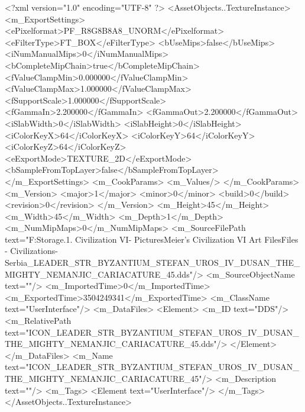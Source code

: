 <?xml version="1.0" encoding="UTF-8" ?>
<AssetObjects..TextureInstance>
	<m_ExportSettings>
		<ePixelformat>PF_R8G8B8A8_UNORM</ePixelformat>
		<eFilterType>FT_BOX</eFilterType>
		<bUseMips>false</bUseMips>
		<iNumManualMips>0</iNumManualMips>
		<bCompleteMipChain>true</bCompleteMipChain>
		<fValueClampMin>0.000000</fValueClampMin>
		<fValueClampMax>1.000000</fValueClampMax>
		<fSupportScale>1.000000</fSupportScale>
		<fGammaIn>2.200000</fGammaIn>
		<fGammaOut>2.200000</fGammaOut>
		<iSlabWidth>0</iSlabWidth>
		<iSlabHeight>0</iSlabHeight>
		<iColorKeyX>64</iColorKeyX>
		<iColorKeyY>64</iColorKeyY>
		<iColorKeyZ>64</iColorKeyZ>
		<eExportMode>TEXTURE_2D</eExportMode>
		<bSampleFromTopLayer>false</bSampleFromTopLayer>
	</m_ExportSettings>
	<m_CookParams>
		<m_Values/>
	</m_CookParams>
	<m_Version>
		<major>1</major>
		<minor>0</minor>
		<build>0</build>
		<revision>0</revision>
	</m_Version>
	<m_Height>45</m_Height>
	<m_Width>45</m_Width>
	<m_Depth>1</m_Depth>
	<m_NumMipMaps>0</m_NumMipMaps>
	<m_SourceFilePath text="F:\Mod Storage\2.1. Civilization VI\Mods\Archive - Pictures\Sid Meier's Civilization VI Art Files\Art Files - Civilizations\Civilization - Serbia\ICON_LEADER_STR_BYZANTIUM_STEFAN_UROS_IV_DUSAN_THE_MIGHTY_NEMANJIC_CARIACATURE_45.dds"/>
	<m_SourceObjectName text=""/>
	<m_ImportedTime>0</m_ImportedTime>
	<m_ExportedTime>3504249341</m_ExportedTime>
	<m_ClassName text="UserInterface"/>
	<m_DataFiles>
		<Element>
			<m_ID text="DDS"/>
			<m_RelativePath text="ICON_LEADER_STR_BYZANTIUM_STEFAN_UROS_IV_DUSAN_THE_MIGHTY_NEMANJIC_CARIACATURE_45.dds"/>
		</Element>
	</m_DataFiles>
	<m_Name text="ICON_LEADER_STR_BYZANTIUM_STEFAN_UROS_IV_DUSAN_THE_MIGHTY_NEMANJIC_CARIACATURE_45"/>
	<m_Description text=""/>
	<m_Tags>
		<Element text="UserInterface"/>
	</m_Tags>
</AssetObjects..TextureInstance>

